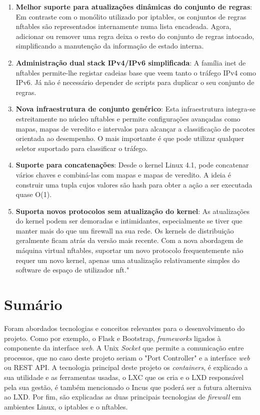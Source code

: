 \begin{enumerate}
\item \textbf{Melhor suporte para atualizações dinâmicas do conjunto de regras}: Em 
contraste com o monólito utilizado por iptables, os conjuntos de regras nftables são 
representados internamente numa lista encadeada. Agora, adicionar ou remover uma regra 
deixa o resto do conjunto de regras intocado, simplificando a manutenção da informação 
de estado interna.

\item \textbf{Administração dual stack IPv4/IPv6 simplificada}: A família inet de 
nftables permite-lhe registar cadeias base que veem tanto o tráfego IPv4 como IPv6. 
Já não é necessário depender de scripts para duplicar o seu conjunto de regras.

\item \textbf{Nova infraestrutura de conjunto genérico}: Esta infraestrutura integra-se 
estreitamente no núcleo nftables e permite configurações avançadas como mapas, mapas 
de veredito e intervalos para alcançar a classificação de pacotes orientada ao desempenho. O mais importante é que pode utilizar qualquer seletor suportado para classificar o tráfego.

\item \textbf{Suporte para concatenações}: Desde o kernel Linux 4.1, pode concatenar 
vários chaves e combiná-las com mapas e mapas de veredito. A ideia é construir uma tupla 
cujos valores são hash para obter a ação a ser executada quase O(1).

\item \textbf{Suporta novos protocolos sem atualização do kernel}: As atualizações do 
kernel podem ser demoradas e intimidantes, especialmente se tiver que manter mais do 
que um firewall na sua rede. Os kernels de distribuição geralmente ficam atrás da 
versão mais recente. Com a nova abordagem de máquina virtual nftables, suportar 
um novo protocolo frequentemente não requer um novo kernel, apenas uma atualização 
relativamente simples do software de espaço de utilizador nft."
\end{enumerate}


\section*{Sumário}

Foram abordados tecnologias e conceitos relevantes para o desenvolvimento do projeto.
Como por exemplo, o Flask e Bootstrap, \textit{frameworks} ligados à componente da 
interface \textit{web}.
A Unix \textit{Socket} que permite a comunicação entre processos, que no caso deste
projeto seriam o "Port Controller" e a interface \textit{web} ou REST API.
A tecnologia principal deste projeto os \textit{containers}, é explicado a sua 
utilidade e as ferramentas usadas, o LXC que os cria e o LXD responsável pela sua 
gestão, é também mencionado o Incus que poderá ser a futura alterniva ao LXD.
Por fim, são explicadas as duas principais tecnologias de \textit{firewall} em 
ambientes Linux, o iptables e o nftables.


